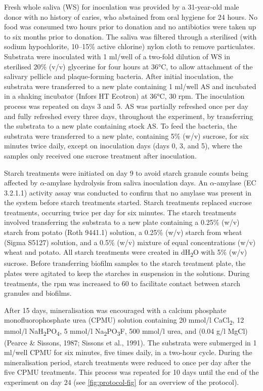 \documentclass[
]{article}
\begin{document}
Fresh whole saliva (WS) for inoculation was provided by a 31-year-old male donor
with no history of caries, who abstained from oral hygiene for 24 hours. No
food was consumed two hours prior to donation and no antibiotics were taken up
to six months prior to donation.
The saliva was filtered through a sterilised (with sodium hypochlorite, 10--15\% active chlorine)
nylon cloth to remove particulates.
Substrata were inoculated with 1 ml/well of a two-fold dilution of WS in sterilised
20\% (v/v) glycerine for four hours at 36°C, to allow attachment of the
salivary pellicle and plaque-forming bacteria. After initial inoculation, the
substrata were transferred to a new plate containing 1 ml/well AS and incubated
in a shaking incubator (Infors HT Ecotron) at 36°C, 30 rpm.
The inoculation process was repeated on days 3 and 5.
AS was partially refreshed once per day and fully refreshed every three days,
throughout the experiment, by transferring the substrata to a new plate containing
stock AS. To feed the bacteria, the substrata were transferred to a new plate, containing
5\% (w/v) sucrose, for six minutes twice daily, except on inoculation days
(days 0, 3, and 5), where the samples only received one sucrose treatment after
inoculation.

Starch treatments were initiated on day 9 to avoid starch granule counts being
affected by \(\alpha\)-amylase hydrolysis from saliva inoculation days.
An \(\alpha\)-amylase (EC 3.2.1.1) activity
assay was conducted to confirm that no amylase was present in the system before
starch treatments started. Starch treatments replaced sucrose treatments, occurring twice per day
for six minutes. The starch treatments involved transferring the substrata to a
new plate containing a 0.25\% (w/v) starch from potato (Roth 9441.1) solution, a 0.25\% (w/v) starch from wheat (Sigma S5127) solution, and a 0.5\% (w/v) mixture of equal
concentrations (w/v) wheat and potato. All starch treatments were created in dH\textsubscript{2}O
with 5\% (w/v) sucrose. Before transferring biofilm samples to the starch treatment
plate, the plates were agitated to keep the starches in suspension in the
solutions. During treatments, the rpm was increased to 60 to facilitate contact
between starch granules and biofilms.

After 15 days, mineralisation was encouraged with a
calcium phosphate monofluorophosphate urea (CPMU) solution containing
20 mmol/l CaCl\textsubscript{2}, 12 mmol/l NaH\textsubscript{2}PO\textsubscript{4}, 5 mmol/l Na\textsubscript{2}PO\textsubscript{3}F, 500 mmol/l urea,
and (0.04 g/l MgCl)
(Pearce \& Sissons, 1987; Sissons et al., 1991).
The substrata were submerged in 1 ml/well CPMU for six minutes, five times
daily, in a two-hour cycle. During the mineralisation period, starch treatments
were reduced to once per day after the five CPMU treatments. This process was repeated
for 10 days until the end of the experiment on day 24
(see \ref{fig:protocol-fig} for an overview of the protocol).
\end{document}
